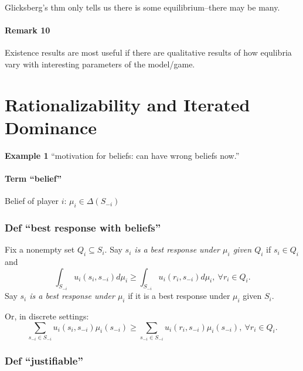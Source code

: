 \documentclass[
]{article}
\begin{document}
Glicksberg's thm only tells us there is some equilibrium--there may be
many.

\hypertarget{remark-10}{%
\paragraph{Remark 10}\label{remark-10}}

Existence results are most useful if there are qualitative results of
how equlibria vary with interesting parameters of the model/game.

\hypertarget{rationalizability-and-iterated-dominance}{%
\section{Rationalizability and Iterated
Dominance}\label{rationalizability-and-iterated-dominance}}

\textbf{Example 1} ``motivation for beliefs: can have wrong beliefs
now.''

\hypertarget{term-belief}{%
\paragraph{Term ``belief''}\label{term-belief}}

Belief of player \(i\): \(\mu_i \in \Delta(S_{-i})\)

\hypertarget{def-best-response-with-beliefs}{%
\subsubsection{Def ``best response with
beliefs''}\label{def-best-response-with-beliefs}}

Fix a nonempty set \(Q_i \subseteq S_i\). Say \emph{\(s_i\) is a best
response under \(\mu_i\) given \(Q_i\)} if \(s_i \in Q_i\) and
\[\int_{S_{-i}} u_i(s_i, s_{-i})d\mu_i \geq \int_{S_{-i}} u_i(r_i, s_{-i})d\mu_i, ~\forall r_i \in Q_i.\]
Say \emph{\(s_i\) is a best response under \(\mu_i\)} if it is a best
response under \(\mu_i\) given \(S_i\).

Or, in discrete settings:
\[\sum_{s_{-i} \in S_{-i}} u_i(s_i, s_{-i})\mu_i(s_{-i}) \geq \sum_{s_{-i} \in S_{-i}} u_i(r_i, s_{-i})\mu_i(s_{-i}), ~\forall r_i \in Q_i.\]

\hypertarget{def-justifiable}{%
\subsubsection{Def ``justifiable''}\label{def-justifiable}}
\end{document}
